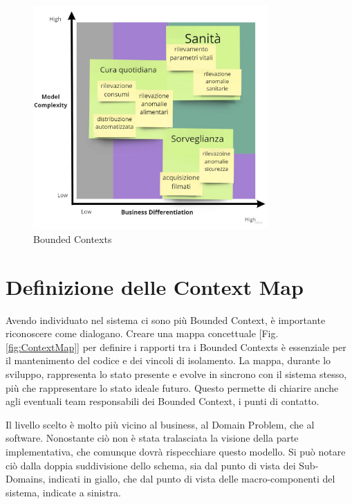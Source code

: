     \begin{figure}[ht]
        \caption{Bounded Contexts}
        \centering
        \includegraphics[width=0.8\textwidth]{Miro/BoundedContext.jpg}
    \end{figure}
    
    \section{Definizione delle Context Map}
    Avendo individuato nel sistema ci sono più Bounded Context, è importante riconoscere come dialogano. Creare una mappa concettuale [Fig. \ref{fig:ContextMap}] per definire i rapporti tra i Bounded Contexts è essenziale per il mantenimento del codice e dei vincoli di isolamento. La mappa, durante lo sviluppo, rappresenta lo stato presente e evolve in sincrono con il sistema stesso, più che rappresentare lo stato ideale futuro. Questo permette di chiarire anche agli eventuali team responsabili dei Bounded Context, i punti di contatto.
    
    Il livello scelto è molto più vicino al business, al Domain Problem, che al software. Nonostante ciò non è stata tralasciata la visione della parte implementativa, che comunque dovrà rispecchiare questo modello. Si può notare ciò dalla doppia suddivisione dello schema, sia dal punto di vista dei Sub-Domains, indicati in giallo, che dal punto di vista delle macro-componenti del sistema, indicate a sinistra. 
    
